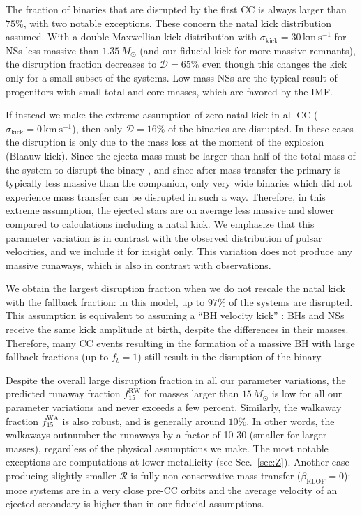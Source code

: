 \documentclass{aa}
\DeclareRobustCommand{\Secref}[1]{Sec.~\ref{#1}}
\begin{document}
The fraction of binaries that are disrupted by the first CC is always larger
than $75\%$, with two notable exceptions. These concern the natal kick
distribution assumed. With a double Maxwellian kick distribution with
$\sigma_\mathrm{kick}=30\,\mathrm{km\ s^{-1}}$ for NSs less massive
than $1.35\,M_\odot$ (and our fiducial kick for more massive
remnants), the disruption fraction
decreases to $\mathcal{D}=65\%$ even though this changes the kick only
for a small subset of the systems. Low mass NSs are the
typical result of progenitors with small total and core masses, which
are favored by the IMF.

If instead we make the extreme assumption of zero
natal kick in all CC ($\sigma_\mathrm{kick}=0\,\mathrm{km\ s^{-1}}$), then only $\mathcal{D}=16\%$ of the
binaries are disrupted. In these cases the disruption is
only due to the mass loss at the moment of the explosion (Blaauw
kick). Since the ejecta mass must be larger than half of the total
mass of the system to disrupt the binary \citep[][]{blaauw:61}, and since after mass
transfer the primary is typically less massive than the companion, only very wide binaries which did not experience mass transfer
can be disrupted in such a way. Therefore, in this extreme assumption,
the ejected stars are on average
less massive and slower compared to calculations including a natal
kick. We emphasize that this parameter variation is in contrast with
the observed distribution of pulsar velocities, and we
include it for insight only. This variation does not produce any massive
runaways, which is also in contrast with observations. 

We obtain the largest disruption
fraction when we do not rescale the natal kick with the fallback
fraction: in this model, up to $97\%$ of the systems are
disrupted. This assumption is equivalent to assuming a ``BH velocity
kick'' \mbox{\citep[e.g.,][]{belczynski:08,fryer:12}}: BHs and NSs receive
the same kick amplitude at birth, despite the differences in their masses. Therefore, many CC events
resulting in the formation of a massive BH with large fallback
fractions (up to $f_b=1$) still result in the disruption of the binary.

Despite the overall large disruption fraction in all our parameter
variations, the predicted runaway fraction $f_{15}^\mathrm{RW}$ for masses larger than $15\,M_\odot$ is low for all our
parameter variations and never exceeds a few percent. Similarly, the walkaway
fraction $f_{15}^\mathrm{WA}$ is also robust, and is generally around
$10\%$. In other words, the walkaways outnumber the runaways by
a factor of 10-30 (smaller for larger masses), regardless of the
physical assumptions we make. The
most notable exceptions are computations at lower metallicity (see
\Secref{sec:Z}). Another case producing slightly smaller $\mathcal{R}$ is
fully non-conservative mass transfer ($\beta_\mathrm{RLOF}=0$): more
systems are in a very close pre-CC orbits and the average velocity of
an ejected secondary is higher than in our fiducial assumptions.
\end{document}
